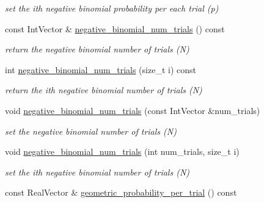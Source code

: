 \begin{DoxyCompactItemize}
\begin{DoxyCompactList}\small\item\em set the ith negative binomial probability per each trial (p) \end{DoxyCompactList}\item 
const Int\+Vector \& \hyperlink{classPecos_1_1AleatoryDistParams_afd85131aec45422361321b276bc44191}{negative\+\_\+binomial\+\_\+num\+\_\+trials} () const \label{classPecos_1_1AleatoryDistParams_afd85131aec45422361321b276bc44191}

\begin{DoxyCompactList}\small\item\em return the negative binomial number of trials (N) \end{DoxyCompactList}\item 
int \hyperlink{classPecos_1_1AleatoryDistParams_a689011254f761e4e74c18165a4598f4e}{negative\+\_\+binomial\+\_\+num\+\_\+trials} (size\+\_\+t i) const \label{classPecos_1_1AleatoryDistParams_a689011254f761e4e74c18165a4598f4e}

\begin{DoxyCompactList}\small\item\em return the ith negative binomial number of trials (N) \end{DoxyCompactList}\item 
void \hyperlink{classPecos_1_1AleatoryDistParams_aa0f53c9ddc4f68e29e204520fe84722f}{negative\+\_\+binomial\+\_\+num\+\_\+trials} (const Int\+Vector \&num\+\_\+trials)\label{classPecos_1_1AleatoryDistParams_aa0f53c9ddc4f68e29e204520fe84722f}

\begin{DoxyCompactList}\small\item\em set the negative binomial number of trials (N) \end{DoxyCompactList}\item 
void \hyperlink{classPecos_1_1AleatoryDistParams_a9e62e71390de2d58cf7125819ab63af5}{negative\+\_\+binomial\+\_\+num\+\_\+trials} (int num\+\_\+trials, size\+\_\+t i)\label{classPecos_1_1AleatoryDistParams_a9e62e71390de2d58cf7125819ab63af5}

\begin{DoxyCompactList}\small\item\em set the ith negative binomial number of trials (N) \end{DoxyCompactList}\item 
const Real\+Vector \& \hyperlink{classPecos_1_1AleatoryDistParams_a7140ef0f76d04bb832b0e34dd3a3a3e0}{geometric\+\_\+probability\+\_\+per\+\_\+trial} () const \label{classPecos_1_1AleatoryDistParams_a7140ef0f76d04bb832b0e34dd3a3a3e0}


\end{DoxyCompactItemize}
